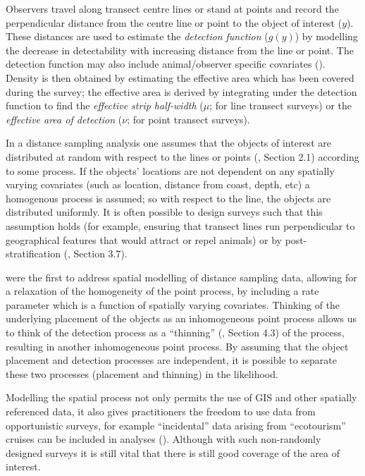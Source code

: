\documentclass[a4paper,12pt]{article}
\begin{document}
Observers travel along transect centre lines or stand at points and record the perpendicular distance from the centre line or point to the object of interest ($y$). These distances are used to estimate the \textit{detection function} ($g(y)$) by modelling the decrease in detectability with increasing distance from the line or point. The detection function may also include animal/observer specific covariates (\cite{Marques:2007vm}). Density is then obtained by estimating the effective area which has been covered during the survey; the effective area is derived by integrating under the detection function to find the \textit{effective strip half-width} ($\mu$; for line transect surveys) or the \textit{effective area of detection} ($\nu$; for point transect surveys). 

In a distance sampling analysis one assumes that the objects of interest are distributed at random with respect to the lines or points (\cite{Buckland:2001vm}, Section 2.1) according to some process. If the objects' locations are not dependent on any spatially varying covariates (such as location, distance from coast, depth, etc) a homogenous process is assumed; so with respect to the line, the objects are distributed uniformly. It is often possible to design surveys such that this assumption holds (for example, ensuring that transect lines run perpendicular to geographical features that would attract or repel animals) or by post-stratification (\cite{Buckland:2001vm}, Section 3.7). 

\cite{Hedley:2004et} were the first to address spatial modelling of distance sampling data, allowing for a relaxation of the homogeneity of the point process, by including a rate parameter which is a function of spatially varying covariates. Thinking of the underlying placement of the objects as an inhomogeneous point process allows us to think of the detection process as a ``thinning'' (\cite{cox1980point}, Section 4.3) of the process, resulting in another inhomogeneous point process. By assuming that the object placement and detection processes are independent, it is possible to separate these two processes (placement and thinning) in the likelihood.

Modelling the spatial process not only permits the use of GIS and other spatially referenced data, it also gives practitioners the freedom to use data from opportunistic surveys, for example ``incidental'' data arising from ``ecotourism'' cruises can be included in analyses (\cite{Williams:2006tz}). Although with such non-randomly designed surveys it is still vital that there is still good coverage of the area of interest.
\end{document}
